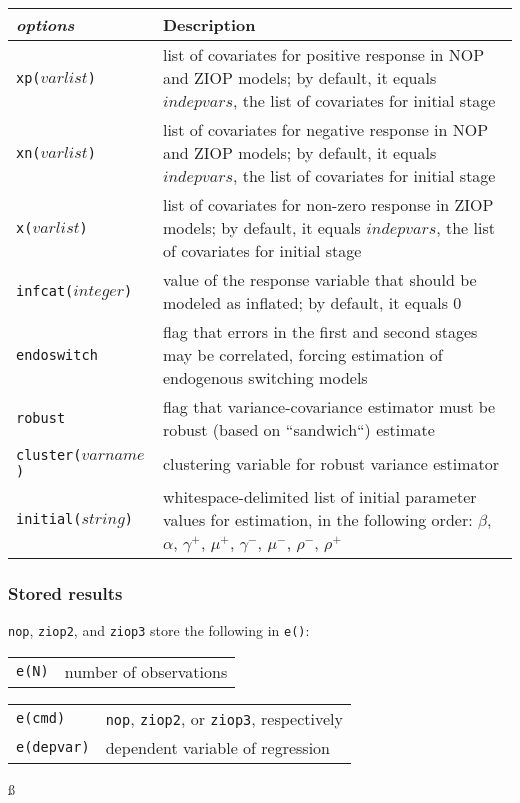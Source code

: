 \documentclass[letterpaper,fleqn,12pt]{article}
\begin{document}
\begin{onehalfspace}
\begin{tabular}{lp{12cm}}
\textit{options} & Description \\ 
\midrule\texttt{xp($varlist$)} & list of covariates for positive response in
NOP and ZIOP models; by default, it equals $indepvars$, the list of
covariates for initial stage \\ 
\texttt{xn($varlist$)} & list of covariates for negative response in NOP and
ZIOP models; by default, it equals $indepvars$, the list of covariates for
initial stage \\ 
\texttt{x($varlist$)} & list of covariates for non-zero response in ZIOP
models; by default, it equals $indepvars$, the list of covariates for
initial stage \\ 
\texttt{infcat($integer$)} & value of the response variable that should be
modeled as inflated; by default, it equals 0 \\ 
\texttt{endoswitch} & flag that errors in the first and second stages may be
correlated, forcing estimation of endogenous switching models \\ 
\texttt{robust} & flag that variance-covariance estimator must be robust
(based on \textquotedblleft sandwich\textquotedblleft ) estimate \\ 
\texttt{cluster($varname$)} & clustering variable for robust variance
estimator \\ 
\texttt{initial($string$)} & whitespace-delimited list of initial parameter
values for estimation, in the following order: $\beta $, $\alpha $, $\gamma
^{+}$, $\mu ^{+}$, $\gamma ^{-}$, $\mu ^{-}$, $\rho ^{-}$, $\rho ^{+}$%
\end{tabular}

\subsubsection*{Stored results}

\texttt{nop}, \texttt{ziop2}, and \texttt{ziop3} store the following in 
\texttt{e()}:


\begin{tabular}{p{3cm}p{12cm}}
\texttt{e(N)} & number of observations%
\end{tabular}


\begin{tabular}{p{3.12cm}p{12cm}}
\texttt{e(cmd)} & \texttt{nop}, \texttt{ziop2}, or \texttt{ziop3},
respectively \\ 
\texttt{e(depvar)} & dependent variable of regression%
\end{tabular}%
\ss 


\end{onehalfspace}
\end{document}
